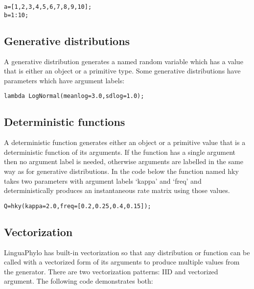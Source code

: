 \documentclass[10pt,letterpaper,table]{article}
\begin{document}
\begin{alltt}
  a = [1, 2, 3, 4, 5, 6, 7, 8, 9, 10];
  b = 1:10;
\end{alltt}

\subsection*{Generative distributions}

A generative distribution generates a named random variable which has a value that is either an object or a primitive type. Some generative distributions have parameters which have argument labels:

{\singlespacing
\begin{alltt}
  lambda ~ LogNormal(meanlog=3.0, sdlog=1.0);
\end{alltt}
}

\subsection*{Deterministic functions}

A deterministic function generates either an object or a primitive value that is a deterministic function of its arguments. If the function has a single argument then no argument label is needed, otherwise arguments are labelled in the same way as for generative distributions. In the code below the function named hky takes two parameters with argument labels `kappa' and `freq' and deterministically produces an instantaneous rate matrix using those values.

{\singlespacing
\begin{alltt}
  Q = hky(kappa=2.0, freq=[0.2, 0.25, 0.4, 0.15]);
\end{alltt}
}

\subsection*{Vectorization}

LinguaPhylo has built-in vectorization so that any distribution or function can be called with a vectorized form of its arguments to produce multiple values from the generator. There are two vectorization patterns: IID and vectorized argument. The following code demonstrates both:
\end{document}
